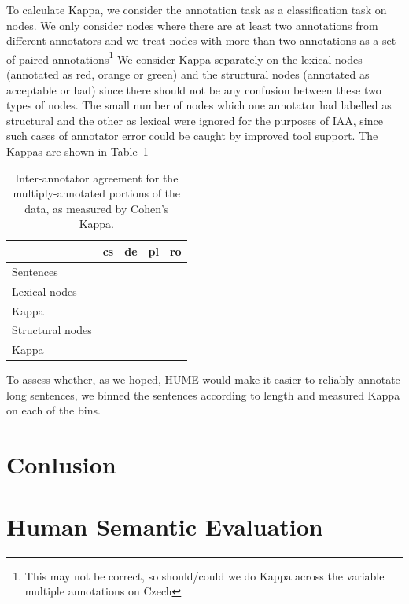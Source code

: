 \documentclass[11pt]{article}
\newcommand{\tabref}[1]{Table~\ref{#1}}
\newcommand{\bh}[2]{\footnote{\color{blue} #1}}
\begin{document}
To calculate Kappa, we consider the annotation task as a classification task on 
nodes. We only consider nodes where there are at least two annotations from different
annotators and we treat nodes with more than two annotations as a set of paired
annotations\bh{This may not be correct, so should/could we do Kappa across the 
variable multiple annotations on Czech}. We consider Kappa separately on the lexical
nodes (annotated as red, orange or green) and the structural nodes (annotated
as acceptable or bad) since there should not be any confusion between these two types of
nodes. The small number of nodes which one annotator had labelled as structural and 
the other as lexical were ignored for the purposes of IAA, since such cases of annotator 
error could be caught by improved tool support.  The Kappas are shown in \tabref{tab:iaa}
\begin{table}[!ht]
\begin{center}
\begin{tabular}{l|cccc}
 & cs & de & pl & ro \\
\hline
Sentences & & & & \\
\hline
Lexical nodes & & & & \\
Kappa & & & & \\
\hline
Structural nodes & & & & \\
Kappa & & & & \\
\end{tabular}
\caption{Inter-annotator agreement for the multiply-annotated portions of the data, as
measured by Cohen's Kappa. }
\label{tab:iaa}
\end{center}
\end{table}


To assess whether, as we hoped, HUME would make it easier to reliably annotate long sentences,
we binned the sentences according to length and measured Kappa on each of the bins.




\section{Conlusion}\label{sec:conclusion}










\section{Human Semantic Evaluation}
\end{document}
